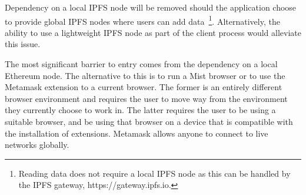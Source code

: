 Dependency on a local IPFS node will be removed should the application choose to provide global IPFS nodes where users can add data~\footnote{Reading data does not require a local IPFS node as this can be handled by the IPFS gateway, https://gateway.ipfs.io.}. Alternatively, the ability to use a lightweight IPFS node as part of the client process would alleviate this issue.

The most significant barrier to entry comes from the dependency on a local Ethereum node. The alternative to this is to run a Mist browser or to use the Metamask extension to a current browser. The former is an entirely different browser environment and requires the user to move way from the environment they currently choose to work in. The latter requires the user to be using a suitable browser, and be using that browser on a device that is compatible with the installation of extensions. Metamask allows anyone to connect to live networks globally.
